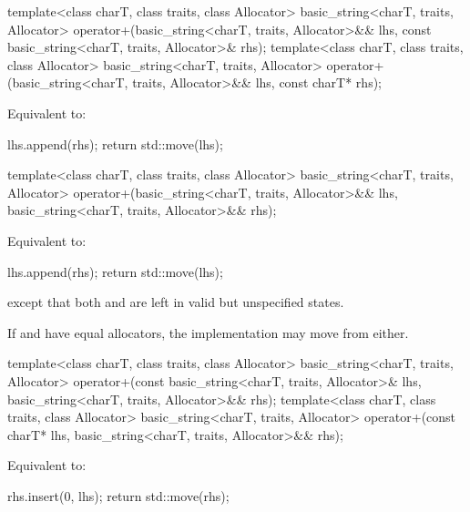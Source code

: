%
\begin{itemdecl}
template<class charT, class traits, class Allocator>
  basic_string<charT, traits, Allocator>
    operator+(basic_string<charT, traits, Allocator>&& lhs,
              const basic_string<charT, traits, Allocator>& rhs);
template<class charT, class traits, class Allocator>
  basic_string<charT, traits, Allocator>
    operator+(basic_string<charT, traits, Allocator>&& lhs, const charT* rhs);
\end{itemdecl}

\begin{itemdescr}
\pnum
\effects
Equivalent to:
\begin{codeblock}
lhs.append(rhs);
return std::move(lhs);
\end{codeblock}
\end{itemdescr}

%
\begin{itemdecl}
template<class charT, class traits, class Allocator>
  basic_string<charT, traits, Allocator>
    operator+(basic_string<charT, traits, Allocator>&& lhs,
              basic_string<charT, traits, Allocator>&& rhs);
\end{itemdecl}

\begin{itemdescr}
\pnum
\effects
Equivalent to:
\begin{codeblock}
lhs.append(rhs);
return std::move(lhs);
\end{codeblock}
except that both  and 
are left in valid but unspecified states.
\begin{note}
If  and  have equal allocators,
the implementation may move from either.
\end{note}
\end{itemdescr}

%
\begin{itemdecl}
template<class charT, class traits, class Allocator>
  basic_string<charT, traits, Allocator>
    operator+(const basic_string<charT, traits, Allocator>& lhs,
              basic_string<charT, traits, Allocator>&& rhs);
template<class charT, class traits, class Allocator>
  basic_string<charT, traits, Allocator>
    operator+(const charT* lhs, basic_string<charT, traits, Allocator>&& rhs);
\end{itemdecl}

\begin{itemdescr}
\pnum
\effects
Equivalent to:
\begin{codeblock}
rhs.insert(0, lhs);
return std::move(rhs);
\end{codeblock}
\end{itemdescr}


